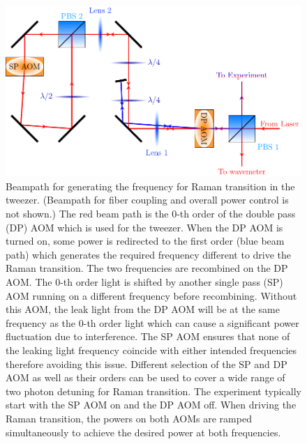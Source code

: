 \begin{figure}
  \centering
  \includegraphics[width=\textwidth]{figures/raman_spectroscopy_raman_beampath.pdf}
  \caption[Beampath to allow driving Raman transition with tweezer]{
    Beampath for generating the frequency for Raman transition in the tweezer.
    (Beampath for fiber coupling and overall power control is not shown.)
    The red beam path is the $0$-th order of the double pass (DP) AOM
    which is used for the tweezer.
    When the DP AOM is turned on, some power is redirected to the first order
    (blue beam path) which generates the required frequency different to drive
    the Raman transition. The two frequencies are recombined on the DP AOM.
    The $0$-th order light is shifted by another single pass (SP) AOM
    running on a different frequency before recombining.
    Without this AOM, the leak light from the DP AOM will be at the same frequency
    as the $0$-th order light which can cause a significant power fluctuation
    due to interference. The SP AOM ensures that none of the leaking light frequency
    coincide with either intended frequencies therefore avoiding this issue.
    Different selection of the SP and DP AOM as well as their orders can be used
    to cover a wide range of two photon detuning for Raman transition.
    The experiment typically start with the SP AOM on and the DP AOM off.
    When driving the Raman transition, the powers on both AOMs are ramped simultaneously
    to achieve the desired power at both frequencies.
    \label{fig:raman-spectroscopy:raman-beampath}}
\end{figure}

